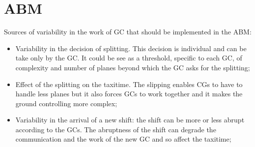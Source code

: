 \documentclass{article}
\begin{document}
\section{ABM}
Sources of variability in the work of GC that should be implemented in the ABM:
\begin{itemize}
    \item Variability in the decision of splitting. This decision is individual and can be take only by the GC. It could be see as a threshold, specific to each GC, of complexity and number of planes beyond which the GC asks for the splitting;
    \item Effect of the splitting on the taxitime. The slipping enables CGs to have to handle less planes but it also forces GCs to work together and it makes the ground controlling more complex;
    \item Variability in the arrival of a new shift: the shift can be more or less abrupt according to the GCs. The abruptness of the shift can degrade the communication and the work of the new GC and so affect the taxitime;
\end{itemize}
\end{document}

